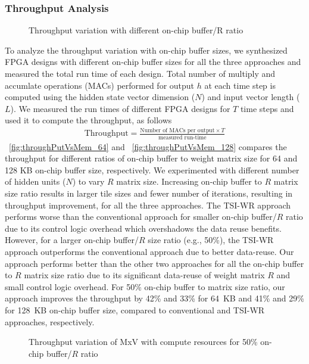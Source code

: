 {{{{\subsubsection{Throughput Analysis}
\begin{figure}[htb!]
	\centering
	   \hspace{2.0em}
	\caption{Throughput variation with different on-chip buffer/R ratio}	\label{fig:throughputVsMem}
\end{figure}
To analyze the throughput variation with on-chip buffer sizes, we synthesized FPGA designs with different on-chip buffer sizes for all the three approaches and measured the total run time of each design. Total number of multiply and accumlate operations (MACs) performed for output $h$ at each time step is computed using the hidden state vector dimension ($N$) and input vector length ($L$). We measured the run times of different FPGA designs for $T$ time steps and used it to compute the throughput, as follows 
\begin{align}\label{eq:througput}
	\text{Throughput}=\frac{\text{Number of MACs per output}{\times}T}{\text{measured run-time}}
\end{align}
\figurename{~\ref{fig:throughPutVsMem_64}} and \figurename{~\ref{fig:throughPutVsMem_128}} compares the throughput for different ratios of on-chip buffer to weight matrix size for 64 and 128 KB on-chip buffer size, respectively.  We experimented with different number of hidden units ($N$) to vary $R$ matrix size. Increasing on-chip buffer to $R$ matrix size ratio results in larger tile sizes and fewer number of iterations, resulting in throughput improvement, for all the three approaches. The TSI-WR approach performs worse than the conventional approach for smaller on-chip buffer/$R$ ratio due to its control logic overhead which overshadows the data reuse benefits. However, for a larger on-chip buffer/$R$ size ratio (e.g., 50\%), the TSI-WR approach outperforms the conventional approach due to better data-reuse. Our approach performs better than the other two approaches for all the on-chip buffer to $R$ matrix size ratio due to its significant data-reuse of weight matrix $R$ and small control logic overhead.
For 50\% on-chip buffer to matrix size ratio, our approach improves the throughput by 42\% and 33\% for 64~KB and 41\% and 29\% for 128~KB on-chip buffer size, compared to conventional and TSI-WR approaches, respectively.
\begin{figure}[htb!]
	\centering
   \hspace{2.0em}
	\caption{Throughput variation of MxV with compute resources for 50\% on-chip buffer/$R$ ratio}	\label{fig:throughputVsPF}
\end{figure}
}}}}
